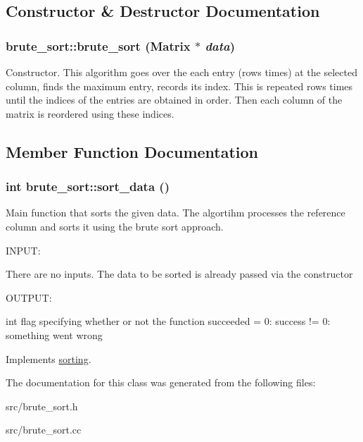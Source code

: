 \subsection{Constructor \& Destructor Documentation}
\hypertarget{classbrute__sort_a2dbbb3b1c89d6a5720d79a5bf150ad1f}{
\subsubsection[{brute\_\-sort}]{\setlength{\rightskip}{0pt plus 5cm}brute\_\-sort::brute\_\-sort ({\bf Matrix} $\ast$ {\em data})}}
\label{d3/d39/classbrute__sort_a2dbbb3b1c89d6a5720d79a5bf150ad1f}


Constructor. This algorithm goes over the each entry (rows times) at the selected column, finds the maximum entry, records its index. This is repeated rows times until the indices of the entries are obtained in order. Then each column of the matrix is reordered using these indices. 

\subsection{Member Function Documentation}
\hypertarget{classbrute__sort_a377b8811e92553a66cdb6780c43e16e6}{
\subsubsection[{sort\_\-data}]{\setlength{\rightskip}{0pt plus 5cm}int brute\_\-sort::sort\_\-data ()}}
\label{d3/d39/classbrute__sort_a377b8811e92553a66cdb6780c43e16e6}


Main function that sorts the given data. The algortihm processes the reference column and sorts it using the brute sort approach.

\begin{DoxyVerb}
  INPUT:

  There are no inputs. The data to be sorted is already passed via the constructor

  
  OUTPUT:

  int          flag specifying whether or not the function succeeded
                = 0: success
	       != 0: something went wrong

  \end{DoxyVerb}
 

Implements \hyperlink{classsorting_a94c4b729732743299f3dcd2505312381}{sorting}.

The documentation for this class was generated from the following files:\begin{DoxyCompactItemize}
\item 
src/brute\_\-sort.h\item 
src/brute\_\-sort.cc\end{DoxyCompactItemize}
